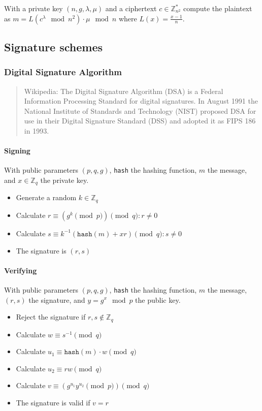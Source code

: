 With a private key $(n, g, \lambda, \mu)$ and a ciphertext $c \in
\mathbb{Z}_{n^2}^*$ compute the plaintext as $m = L(c^{\lambda} \mod n^2) \cdot
\mu \mod n$ where $L(x) = \frac{x-1}{n}$.

\subsection{Signature schemes}
\subsubsection{Digital Signature Algorithm}

\begin{quote}{Wikipedia:}
  The Digital Signature Algorithm (DSA) is a Federal Information Processing Standard
  for digital signatures. In August 1991 the National Institute of Standards and
  Technology (NIST) proposed DSA for use in their Digital Signature Standard (DSS)
  and adopted it as FIPS 186 in 1993.
\end{quote}

\paragraph{Signing}

With public parameters $(p, q, g)$, \texttt{hash} the hashing function,
$m$ the message, and $x \in \mathbb{Z}_q$ the private key.

\begin{itemize}
  \item Generate a random $k \in \mathbb{Z}_q$
  \item Calculate $r \equiv (g^k \pmod p) \pmod q : r \neq 0$
  \item Calculate $s \equiv k^{-1}(\texttt{hash}(m) + xr) \pmod q : s \neq 0$
  \item The signature is $(r, s)$
\end{itemize}

\paragraph{Verifying}

With public parameters $(p, q, g)$, \texttt{hash} the hashing function,
$m$ the message, $(r, s)$ the signature, and $y = g^x \mod p$ the public key.

\begin{itemize}
  \item Reject the signature if $r, s \notin \mathbb{Z}_q$
  \item Calculate $w \equiv s^{-1} \pmod q$
  \item Calculate $u_1 \equiv \texttt{hash}(m) \cdot w \pmod q$
  \item Calculate $u_2 \equiv rw \pmod q$
  \item Calculate $v \equiv (g^{u_1}y^{u_2} \pmod p) \pmod q$
  \item The signature is valid if $v = r$
\end{itemize}

